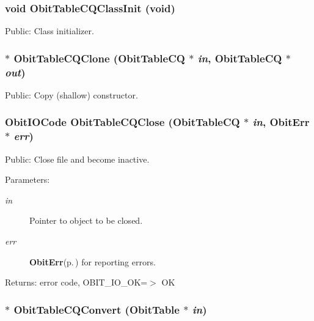 \subsubsection{\setlength{\rightskip}{0pt plus 5cm}void Obit\-Table\-CQClass\-Init (void)}\label{ObitTableCQ_8h_a10}


Public: Class initializer. 

\subsubsection{$\ast$ Obit\-Table\-CQClone ({\bf Obit\-Table\-CQ} $\ast$ {\em in}, {\bf Obit\-Table\-CQ} $\ast$ {\em out})}\label{ObitTableCQ_8h_a15}


Public: Copy (shallow) constructor. 

\subsubsection{\setlength{\rightskip}{0pt plus 5cm}Obit\-IOCode Obit\-Table\-CQClose ({\bf Obit\-Table\-CQ} $\ast$ {\em in}, {\bf Obit\-Err} $\ast$ {\em err})}\label{ObitTableCQ_8h_a21}


Public: Close file and become inactive. 

\begin{Desc}
\item[Parameters:]
\begin{description}
\item[{\em in}]Pointer to object to be closed. \item[{\em err}]{\bf Obit\-Err}{\rm (p.\,\pageref{structObitErr})} for reporting errors. \end{description}
\end{Desc}
\begin{Desc}
\item[Returns:]error code, OBIT\_\-IO\_\-OK=$>$ OK \end{Desc}
\subsubsection{$\ast$ Obit\-Table\-CQConvert ({\bf Obit\-Table} $\ast$ {\em in})}\label{ObitTableCQ_8h_a16}


